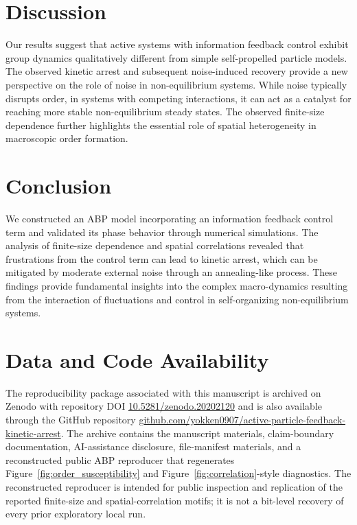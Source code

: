 \documentclass[12pt]{article}
\begin{document}
\section{Discussion}
Our results suggest that active systems with information feedback control exhibit group dynamics qualitatively different from simple self-propelled particle models\cite{1,4}. The observed kinetic arrest\cite{7} and subsequent noise-induced recovery provide a new perspective on the role of noise in non-equilibrium systems\cite{8}. While noise typically disrupts order, in systems with competing interactions, it can act as a catalyst for reaching more stable non-equilibrium steady states. The observed finite-size dependence further highlights the essential role of spatial heterogeneity in macroscopic order formation.

\section{Conclusion}
We constructed an ABP model incorporating an information feedback control term and validated its phase behavior through numerical simulations. The analysis of finite-size dependence and spatial correlations revealed that frustrations from the control term can lead to kinetic arrest, which can be mitigated by moderate external noise through an annealing-like process. These findings provide fundamental insights into the complex macro-dynamics resulting from the interaction of fluctuations and control in self-organizing non-equilibrium systems.

\section*{Data and Code Availability}
The reproducibility package associated with this manuscript is archived on Zenodo with repository DOI \href{https://doi.org/10.5281/zenodo.20202120}{10.5281/zenodo.20202120} and is also available through the GitHub repository \href{https://github.com/yokken0907/active-particle-feedback-kinetic-arrest}{github.com/yokken0907/active-particle-feedback-kinetic-arrest}. The archive contains the manuscript materials, claim-boundary documentation, AI-assistance disclosure, file-manifest materials, and a reconstructed public ABP reproducer that regenerates Figure~\ref{fig:order_susceptibility} and Figure~\ref{fig:correlation}-style diagnostics. The reconstructed reproducer is intended for public inspection and replication of the reported finite-size and spatial-correlation motifs; it is not a bit-level recovery of every prior exploratory local run.
\end{document}
